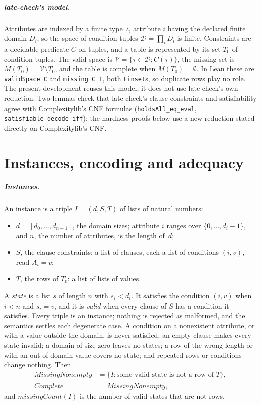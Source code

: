 \documentclass[pdflatex,sn-mathphys-num]{sn-jnl}
\theoremstyle{thmstyleone}
\theoremstyle{thmstylethree}
\begin{document}
\subparagraph*{latc-check's model.}
Attributes are indexed by a finite type~$\iota$, attribute $i$ having the declared finite domain
$D_i$, so the space of condition tuples $\mathcal{D} = \prod_i D_i$ is finite. Constraints are a
decidable predicate $C$ on tuples, and a table is represented by its set $T_0$ of condition
tuples. The valid space is $\mathcal{V} = \{\tau \in \mathcal{D} : C(\tau)\}$, the missing set is
$M(T_0) = \mathcal{V} \setminus T_0$, and the table is complete when $M(T_0) = \emptyset$. In
Lean these are \lstinline{validSpace C} and \lstinline{missing C T}, both \lstinline{Finset}s, so
duplicate rows play no role. The present development reuses this model; it does not use
latc-check's own reduction. Two lemmas check that latc-check's clause constraints and
satisfiability agree with Complexitylib's CNF formulas (\lstinline{holdsAll_eq_eval},
\lstinline{satisfiable_decode_iff}); the hardness proofs below use a new reduction stated
directly on Complexitylib's CNF.

\section{Instances, encoding and adequacy}
\label{sec:encoding}

\subparagraph*{Instances.}
An instance is a triple $I = (d, S, T)$ of lists of natural numbers:
\begin{itemize}
\item $d = [d_0, \dots, d_{n-1}]$, the domain sizes; attribute $i$ ranges over
  $\{0, \dots, d_i - 1\}$, and $n$, the number of attributes, is the length of~$d$;
\item $S$, the clause constraints: a list of clauses, each a list of conditions $(i, v)$, read
  $A_i = v$;
\item $T$, the rows of $T_0$: a list of lists of values.
\end{itemize}
A \emph{state} is a list $s$ of length $n$ with $s_i < d_i$. It satisfies the condition $(i, v)$
when $i < n$ and $s_i = v$, and it is \emph{valid} when every clause of $S$ has a condition it
satisfies. Every triple is an instance; nothing is rejected as malformed, and the semantics
settles each degenerate case. A condition on a nonexistent attribute, or with a value outside
the domain, is never satisfied; an empty clause makes every state invalid; a domain of size
zero leaves no states; a row of the wrong length or with an out-of-domain value covers no state;
and repeated rows or conditions change nothing. Then
\begin{align*}
\textit{MissingNonempty} &= \{I : \text{some valid state is not a row of } T\},\\
\textit{Complete} &= \overline{\textit{MissingNonempty}},
\end{align*}
and $\textit{missingCount}(I)$ is the number of valid states that are not rows.
\end{document}
